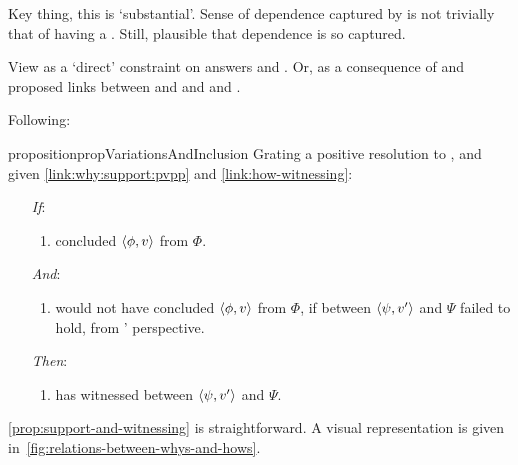 \begin{note}
  \color{red}
  Key thing, this is `substantial'.
  Sense of dependence captured by \qWhyVnP{} is not trivially that of having a \witness{}.
  Still, plausible that dependence is so captured.
\end{note}

\begin{note}
  View \issueConstraint{} as a `direct' constraint on answers \qWhyVnP{} and \qWhy{}.
  Or, as a consequence of \issueInclusion{} and proposed links between \qWhy{} and \qWhyVnP{} and \qHowV{} and \qHow{}.
\end{note}

\begin{note}
 Following:

  \begin{restatable}[]{proposition}{propVariationsAndInclusion}
    \label{prop:support-and-witnessing}
    Grating a positive resolution to \issueInclusion{}, and given \autoref{link:why:support:pvpp} and \autoref{link:how-witnessing}:
    \begin{enumerate}
    \item[\emph{If}:]
      \begin{enumerate}[label=\alph*., ref=(\alph*)]
      \item \vAgent{} concluded \(\langle \phi, v \rangle\) from \(\Phi\).
      \end{enumerate}
    \item[\emph{And}:]
      \begin{enumerate}[label=\alph*., ref=(\alph*), resume]
      \item
        \vAgent{} would not have concluded \(\langle \phi, v \rangle\) from \(\Phi\), if \support{} between \(\langle \psi, v' \rangle\) and \(\Psi\) failed to hold, from \vAgent{}' perspective.
      \end{enumerate}
    \item[\emph{Then}:]
      \begin{enumerate}[label=\alph*., ref=(\alph*), resume]
      \item
        \vAgent{} has witnessed \support{} between \(\langle \psi, v' \rangle\) and \(\Psi\).
      \end{enumerate}
    \end{enumerate}
  \end{restatable}

  \autoref{prop:support-and-witnessing} is straightforward.
  A visual representation is given in~\autoref{fig:relations-between-whys-and-hows}.
\end{note}

